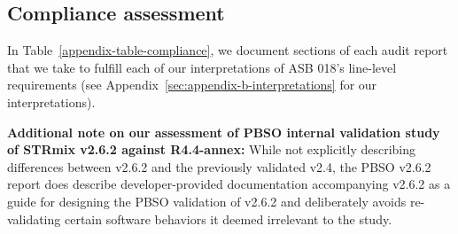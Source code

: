 \subsection{Compliance assessment}
In Table~\ref{appendix-table-compliance}, we document sections of each audit report that we take to fulfill each of our interpretations of ASB 018's line-level requirements (see Appendix~\ref{sec:appendix-b-interpretations} for our interpretations). 

\textbf{Additional note on our assessment of PBSO internal validation study of STRmix v2.6.2 against R4.4-annex:} While not explicitly describing differences between v2.6.2 and the previously validated v2.4, the PBSO v2.6.2 report does describe developer-provided documentation accompanying v2.6.2 as a guide for designing the PBSO validation of v2.6.2 and deliberately avoids re-validating certain software behaviors it deemed irrelevant to the study.


